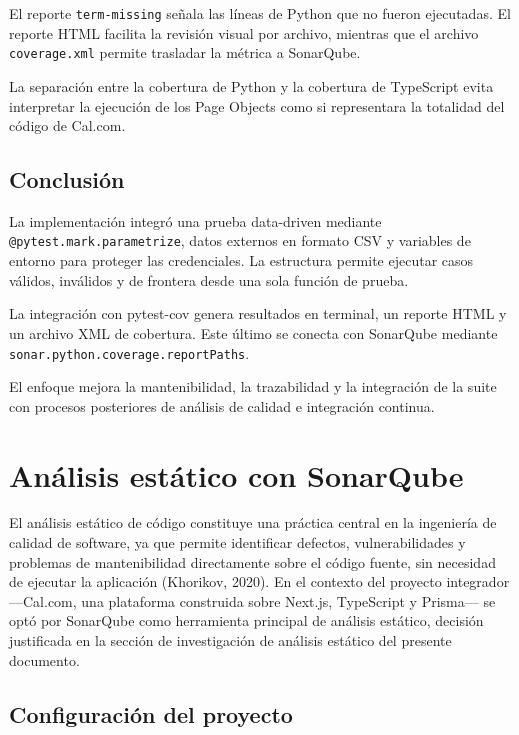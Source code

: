 \documentclass[12pt,letterpaper]{article}
\begin{document}
El reporte \texttt{term-missing} señala las líneas de Python que no fueron ejecutadas. El reporte HTML facilita la revisión visual por archivo, mientras que el archivo \texttt{coverage.xml} permite trasladar la métrica a SonarQube.

La separación entre la cobertura de Python y la cobertura de TypeScript evita interpretar la ejecución de los Page Objects como si representara la totalidad del código de Cal.com.

\subsection{Conclusión}

La implementación integró una prueba data-driven mediante \texttt{@pytest.mark.parametrize}, datos externos en formato CSV y variables de entorno para proteger las credenciales. La estructura permite ejecutar casos válidos, inválidos y de frontera desde una sola función de prueba.

La integración con pytest-cov genera resultados en terminal, un reporte HTML y un archivo XML de cobertura. Este último se conecta con SonarQube mediante \texttt{sonar.python.coverage.reportPaths}.

El enfoque mejora la mantenibilidad, la trazabilidad y la integración de la suite con procesos posteriores de análisis de calidad e integración continua.


\section{Análisis estático con SonarQube}

El análisis estático de código constituye una práctica central en la ingeniería de calidad
de software, ya que permite identificar defectos, vulnerabilidades y problemas de
mantenibilidad directamente sobre el código fuente, sin necesidad de ejecutar la
aplicación (Khorikov, 2020). En el contexto del proyecto integrador ---Cal.com, una
plataforma construida sobre Next.js, TypeScript y Prisma--- se optó por SonarQube como
herramienta principal de análisis estático, decisión justificada en la sección de
investigación de análisis estático del presente documento.

\subsection{Configuración del proyecto}
\end{document}
